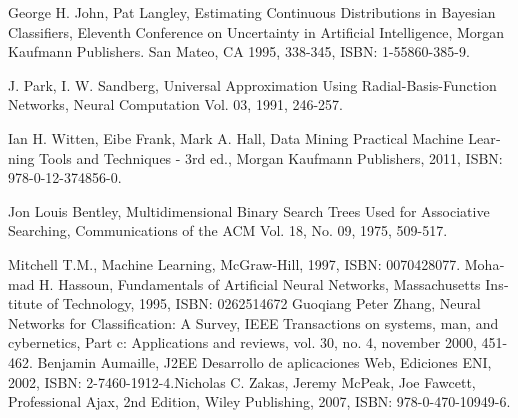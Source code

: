 \begin{thebibliography}{Referencias}
George H. John, Pat Langley, Estimating Continuous Distributions in Bayesian Classifiers, Eleventh Conference on Uncertainty in Artificial Intelligence, Morgan Kaufmann Publishers. San Mateo, CA 1995, 338-345, ISBN: 1-55860-385-9.

J. Park, I. W. Sandberg, Universal Approximation Using Radial-Basis-Function
Networks, Neural Computation Vol.
03, 1991, 246-257.

\foreignlanguage{spanish}{Ian H. Witten, Eibe Frank, Mark A. Hall, Data Mining
Practical Machine Learning
Tools and Techniques - 3rd ed., Morgan Kaufmann Publishers, 2011, ISBN: 978-0-12-374856-0.}

Jon Louis Bentley, Multidimensional Binary Search Trees Used for Associative Searching, Communications of the ACM Vol. 18, No. 09, 1975, 509-517.

\foreignlanguage{spanish}{Mitchell T.M., Machine Learning, McGraw-Hill, 1997, ISBN: 0070428077.} \foreignlanguage{spanish}{Mohamad H. Hassoun, Fundamentals of Artificial Neural Networks, Massachusetts Institute of Technology, 1995, ISBN: 0262514672}
Guoqiang Peter Zhang, Neural Networks for Classification: A Survey, IEEE Transactions on systems, man, and cybernetics, Part c: Applications and reviews, vol. 30, no. 4, november 2000, 451-462.
Benjamin Aumaille, J2EE Desarrollo de aplicaciones Web, Ediciones ENI, 2002, ISBN: 2-7460-1912-4.Nicholas C. Zakas, Jeremy McPeak, Joe Fawcett, Professional Ajax, 2nd Edition, Wiley Publishing, 2007, ISBN: 978-0-470-10949-6.\end{thebibliography}